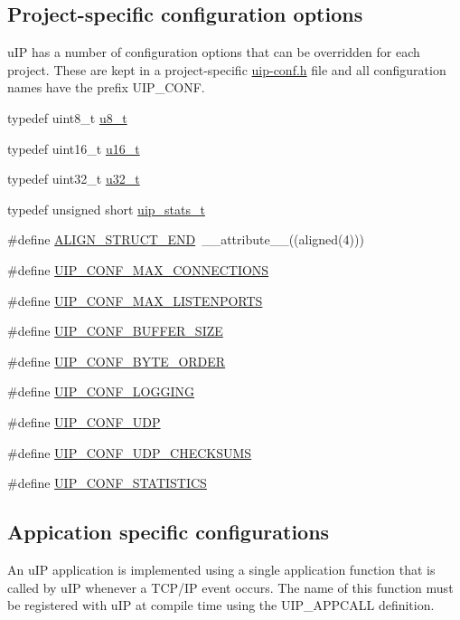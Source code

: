 \subsection*{Project-\/specific configuration options}
\label{_amgrpa633c8dacb583c46c2a4af56ab61e8ca}
 uIP has a number of configuration options that can be overridden for each project. These are kept in a project-\/specific \hyperlink{uip-conf_8h}{uip-\/conf.h} file and all configuration names have the prefix UIP\_\-CONF. \begin{DoxyCompactItemize}
\item 
typedef uint8\_\-t \hyperlink{group__uipfw_ga4caecabca98b43919dd11be1c0d4cd8e}{u8\_\-t}
\item 
typedef uint16\_\-t \hyperlink{group__uipfw_ga77570ac4fcab86864fa1916e55676da2}{u16\_\-t}
\item 
typedef uint32\_\-t \hyperlink{group__uipfw_ga4c14294869aceba3ef9d4c0c302d0f33}{u32\_\-t}
\item 
typedef unsigned short \hyperlink{group__uipfw_ga727459e5c4f777543c81ffffa3df3f0c}{uip\_\-stats\_\-t}
\item 
\#define \hyperlink{group__uipfw_ga8dbc55e1183365cafdd75d7c18215bb2}{ALIGN\_\-STRUCT\_\-END}~\_\-\_\-attribute\_\-\_\-((aligned(4)))
\item 
\#define \hyperlink{group__uipfw_ga3f6f1f6f98431f2d33ed30a30d2ccc35}{UIP\_\-CONF\_\-MAX\_\-CONNECTIONS}
\item 
\#define \hyperlink{group__uipfw_ga974c9b4bbe6b07cc1d64ac4fad278030}{UIP\_\-CONF\_\-MAX\_\-LISTENPORTS}
\item 
\#define \hyperlink{group__uipfw_gacacc406c3bf7d0e00412e4c946252739}{UIP\_\-CONF\_\-BUFFER\_\-SIZE}
\item 
\#define \hyperlink{group__uipfw_gaca1240bba5dd57f8c7c27123c84a1f6d}{UIP\_\-CONF\_\-BYTE\_\-ORDER}
\item 
\#define \hyperlink{group__uipfw_ga3001114ddadc1f2ada5cc9a780e866fc}{UIP\_\-CONF\_\-LOGGING}
\item 
\#define \hyperlink{group__uipfw_ga763f12007aad8cc0e483bf50f8a8d9b4}{UIP\_\-CONF\_\-UDP}
\item 
\#define \hyperlink{group__uipfw_ga9dd44616d41cef74d3beb51d8be5ecec}{UIP\_\-CONF\_\-UDP\_\-CHECKSUMS}
\item 
\#define \hyperlink{group__uipfw_ga529648ad3b0b327a43689b0f1779ff55}{UIP\_\-CONF\_\-STATISTICS}
\end{DoxyCompactItemize}
\subsection*{Appication specific configurations}
\label{_amgrp7ca3fa6f6e17e833a8efbc08a22e4439}
 An uIP application is implemented using a single application function that is called by uIP whenever a TCP/IP event occurs. The name of this function must be registered with uIP at compile time using the UIP\_\-APPCALL definition.

